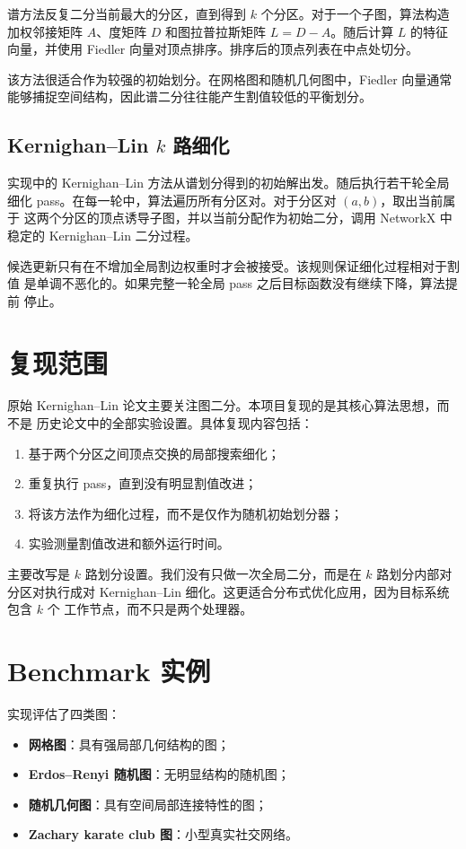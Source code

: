\documentclass[UTF8, 11pt]{ctexart}
\begin{document}
谱方法反复二分当前最大的分区，直到得到 $k$ 个分区。对于一个子图，算法构造
加权邻接矩阵 $A$、度矩阵 $D$ 和图拉普拉斯矩阵 $L=D-A$。随后计算 $L$ 的特征
向量，并使用 Fiedler 向量对顶点排序。排序后的顶点列表在中点处切分。

该方法很适合作为较强的初始划分。在网格图和随机几何图中，Fiedler 向量通常
能够捕捉空间结构，因此谱二分往往能产生割值较低的平衡划分。

\subsection{Kernighan--Lin $k$ 路细化}

实现中的 Kernighan--Lin 方法从谱划分得到的初始解出发。随后执行若干轮全局
细化 pass。在每一轮中，算法遍历所有分区对。对于分区对 $(a,b)$，取出当前属于
这两个分区的顶点诱导子图，并以当前分配作为初始二分，调用 NetworkX 中稳定的
Kernighan--Lin 二分过程。

候选更新只有在不增加全局割边权重时才会被接受。该规则保证细化过程相对于割值
是单调不恶化的。如果完整一轮全局 pass 之后目标函数没有继续下降，算法提前
停止。

\section{复现范围}

原始 Kernighan--Lin 论文主要关注图二分。本项目复现的是其核心算法思想，而不是
历史论文中的全部实验设置。具体复现内容包括：
\begin{enumerate}
    \item 基于两个分区之间顶点交换的局部搜索细化；
    \item 重复执行 pass，直到没有明显割值改进；
    \item 将该方法作为细化过程，而不是仅作为随机初始划分器；
    \item 实验测量割值改进和额外运行时间。
\end{enumerate}

主要改写是 $k$ 路划分设置。我们没有只做一次全局二分，而是在 $k$ 路划分内部对
分区对执行成对 Kernighan--Lin 细化。这更适合分布式优化应用，因为目标系统包含
$k$ 个 工作节点，而不只是两个处理器。

\section{Benchmark 实例}

实现评估了四类图：
\begin{itemize}
    \item \textbf{网格图}：具有强局部几何结构的图；
    \item \textbf{Erdos--Renyi 随机图}：无明显结构的随机图；
    \item \textbf{随机几何图}：具有空间局部连接特性的图；
    \item \textbf{Zachary karate club 图}：小型真实社交网络。
\end{itemize}
\end{document}
